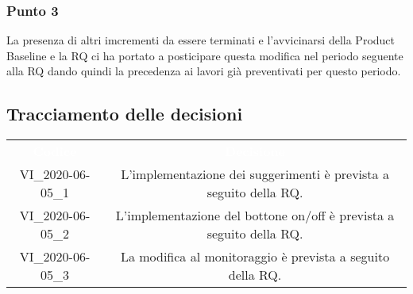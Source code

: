 \subsubsection{Punto 3}
La presenza di altri imcrementi da essere terminati e l'avvicinarsi della Product Baseline e la RQ ci ha portato a posticipare questa modifica nel periodo seguente alla RQ dando quindi la precedenza ai lavori già preventivati per questo periodo.

\pagebreak
\subsection{Tracciamento delle decisioni}
\begin{longtable}{ c | c }
\rowcolor{redafk}
\textcolor{white}{\textbf{Codice}} & \textcolor{white}{\textbf{Decisione}}\\	
		VI\_2020-06-05\_1 & L'implementazione dei suggerimenti è prevista a seguito della RQ. \\
		VI\_2020-06-05\_2 & L'implementazione del bottone on/off è prevista a seguito della RQ. \\
		VI\_2020-06-05\_3 & La modifica al monitoraggio è prevista a seguito della RQ.
\end{longtable}

